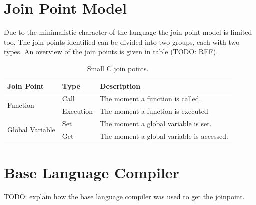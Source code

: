 \documentclass[a4paper]{report}
\begin{document}
\section{Join Point Model}
Due to the minimalistic character of the language the join point model is limited too. The join points identified can be divided into two groups, each with two types. An overview of the join points is given in table (TODO: REF).
\begin{table}
\centering
\begin{tabular}{|l|l|l|}
\hline
Join Point & Type & Description\\
\hline
\multirow{2}{*}{Function} & Call & The moment a function is called.\\
& Execution & The moment a function is executed\\
\hline
\multirow{2}{*}{Global Variable} & Set & The moment a global variable is set.\\
& Get & The moment a global variable is accessed.\\
\hline
\end{tabular}
\label{tab:SmallC_JoinPoints}
\caption{Small C join points.}
\end{table}

\section{Base Language Compiler}
TODO: explain how the base language compiler was used to get the joinpoint.
\end{document}
